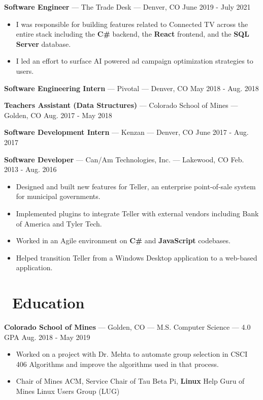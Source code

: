 \documentclass[10pt,letterpaper]{article}
\begin{document}
\textbf{Software Engineer} --- The Trade Desk --- Denver, CO
\hfill June 2019 - July 2021
\begin{itemize}
    \item I was responsible for building features related to Connected TV across
        the entire stack including the \textbf{C\#} backend, the \textbf{React}
        frontend, and the \textbf{SQL Server} database.
    \item I led an effort to surface AI powered ad campaign optimization
        strategies to users.
\end{itemize}

\textbf{Software Engineering Intern} --- Pivotal --- Denver, CO
\hfill May 2018 - Aug. 2018

\vspace{2pt}
\textbf{Teachers Assistant (Data Structures)} --- Colorado School of Mines ---
Golden, CO \hfill Aug. 2017 - May 2018

\vspace{2pt}
\textbf{Software Development Intern} --- Kenzan --- Denver, CO
\hfill June 2017 - Aug. 2017

\vspace{2pt}
\textbf{Software Developer} --- Can/Am Technologies, Inc. --- Lakewood, CO
\hfill Feb. 2013 - Aug. 2016
\begin{itemize}
    \item Designed and built new features for Teller, an enterprise
        point-of-sale system for municipal governments.
    \item Implemented plugins to integrate Teller with external vendors
        including Bank of America and Tyler Tech.
    \item Worked in an Agile environment on \textbf{C\#} and \textbf{JavaScript}
        codebases.
    \item Helped transition Teller from a Windows Desktop application to a
        web-based application.
\end{itemize}

\section*{\faBook\ Education}
\textbf{Colorado School of Mines} --- Golden, CO --- M.S. Computer Science --- 4.0 GPA
\hfill Aug. 2018 - May 2019
\begin{itemize}
    \item Worked on a project with Dr. Mehta to automate group selection in
        CSCI 406 Algorithms and improve the algorithms used in that process.
    \item Chair of Mines ACM, Service Chair of Tau Beta Pi, \textbf{Linux} Help
        Guru of Mines Linux Users Group (LUG)
\end{itemize}
\end{document}
